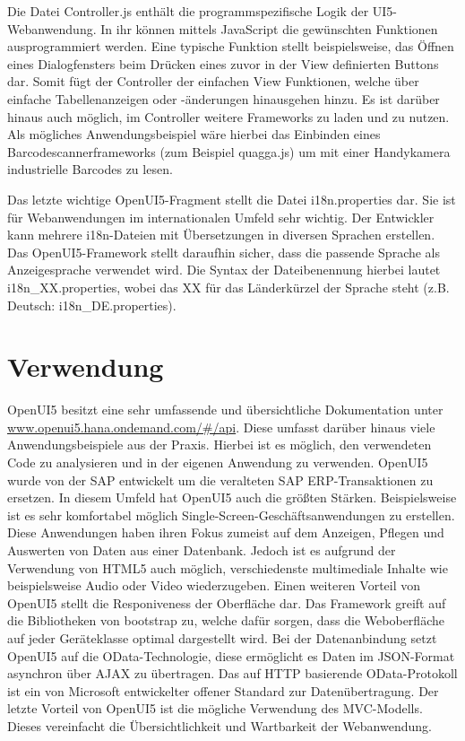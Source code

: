Die Datei Controller.js enthält die programmspezifische Logik der UI5-Webanwendung. In ihr können mittels JavaScript die gewünschten Funktionen ausprogrammiert werden. Eine typische Funktion stellt beispielsweise, das Öffnen eines Dialogfensters beim Drücken eines zuvor in der View definierten Buttons dar. Somit fügt der Controller der einfachen View Funktionen, welche über einfache Tabellenanzeigen oder -änderungen hinausgehen hinzu. Es ist darüber hinaus auch möglich, im Controller weitere Frameworks zu laden und zu nutzen. Als mögliches Anwendungsbeispiel wäre hierbei das Einbinden eines Barcodescannerframeworks (zum Beispiel quagga.js) um mit einer Handykamera industrielle Barcodes zu lesen.

Das letzte wichtige OpenUI5-Fragment stellt die Datei i18n.properties dar. Sie ist für Webanwendungen im internationalen Umfeld sehr wichtig. Der Entwickler kann mehrere i18n-Dateien mit Übersetzungen in diversen Sprachen erstellen. Das OpenUI5-Framework stellt daraufhin sicher, dass die passende Sprache als Anzeigesprache verwendet wird. Die Syntax der Dateibenennung hierbei lautet i18n\_XX.properties, wobei das XX für das Länderkürzel der Sprache steht (z.B. Deutsch: i18n\_DE.properties).\autocites[vgl.][126\psqq]{Antolovic2014}


\section{Verwendung}

OpenUI5 besitzt eine sehr umfassende und übersichtliche Dokumentation unter \url{www.openui5.hana.ondemand.com/#/api}. Diese umfasst darüber hinaus viele Anwendungsbeispiele aus der Praxis. Hierbei ist es möglich, den verwendeten Code zu analysieren und in der eigenen Anwendung zu verwenden. OpenUI5 wurde von der SAP entwickelt um die veralteten SAP ERP-Transaktionen zu ersetzen. In diesem Umfeld hat OpenUI5 auch die größten Stärken. Beispielsweise ist es sehr komfortabel möglich Single-Screen-Geschäftsanwendungen zu erstellen. Diese Anwendungen haben ihren Fokus zumeist auf dem Anzeigen, Pflegen und Auswerten von Daten aus einer Datenbank. Jedoch ist es aufgrund der Verwendung von HTML5 auch möglich, verschiedenste multimediale Inhalte wie beispielsweise Audio oder Video wiederzugeben. Einen weiteren Vorteil von OpenUI5 stellt die Responiveness der Oberfläche dar. Das Framework greift auf die Bibliotheken von bootstrap zu, welche dafür sorgen, dass die Weboberfläche auf jeder Geräteklasse optimal dargestellt wird. Bei der Datenanbindung setzt OpenUI5 auf die OData-Technologie, diese ermöglicht es Daten im JSON-Format asynchron über AJAX zu übertragen. Das auf HTTP basierende OData-Protokoll ist ein von Microsoft entwickelter offener Standard zur Datenübertragung. Der letzte Vorteil von OpenUI5 ist die mögliche Verwendung des MVC-Modells. Dieses vereinfacht die Übersichtlichkeit und Wartbarkeit der Webanwendung. 
